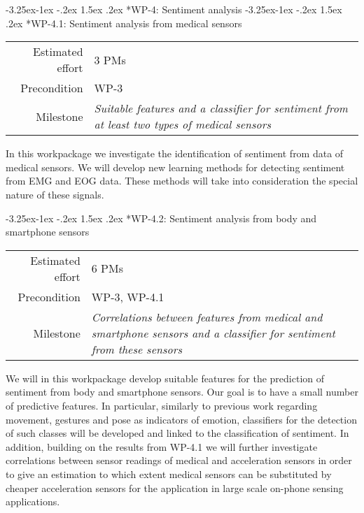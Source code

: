 \documentclass[12pt]{article}
\makeatletter
\newcommand{\kobyc}[1]{\begin{center}\fbox{\parbox{3in}{{\textcolor{green}{K: #1}}}}\end{center}}
\renewcommand\paragraph{\@startsection{paragraph}{4}{\z@}%
  {-3.25ex\@plus -1ex \@minus -.2ex}%
  {1.5ex \@plus .2ex}%
  {\normalfont\normalsize\bfseries}}
\makeatother
\begin{document}
 

\paragraph*{WP-4: Sentiment analysis}
\paragraph*{WP-4.1: Sentiment analysis from medical sensors}
\begin{tabular}{rl}
	Estimated effort& 3 PMs\\
	Precondition & WP-3\\
	Milestone & \begin{minipage}[t]{12.2cm}
		\textit{Suitable features and a classifier for sentiment from at least two types of medical sensors}\vspace{.2cm}
	\end{minipage}
\end{tabular}

\noindent
In this workpackage we investigate the identification of sentiment from data of medical sensors. 
We will develop new learning methods for detecting sentiment from EMG and EOG data. 
These methods will take into consideration the special nature of these signals.

\paragraph*{WP-4.2: Sentiment analysis from body and smartphone sensors}
\begin{tabular}{rl}
	Estimated effort& 6 PMs\\
	Precondition & WP-3, WP-4.1\\
	Milestone & \begin{minipage}[t]{12.2cm}
		\textit{Correlations between features from medical and smartphone sensors and a classifier for sentiment from these sensors}\vspace{.2cm}
	\end{minipage}
\end{tabular}

\noindent
We will in this workpackage develop suitable features for the prediction of sentiment from body and smartphone sensors. Our goal is to have a small number of predictive features. 
In particular, similarly to previous work regarding movement, gestures and pose as indicators of emotion, classifiers for the detection of such classes will be developed and linked to the classification of sentiment. 
In addition, building on the results from WP-4.1 we will further investigate correlations between sensor readings of medical and acceleration sensors in order to give an estimation to which extent medical sensors can be substituted by cheaper acceleration sensors for the application in large scale on-phone sensing applications.
\end{document}
